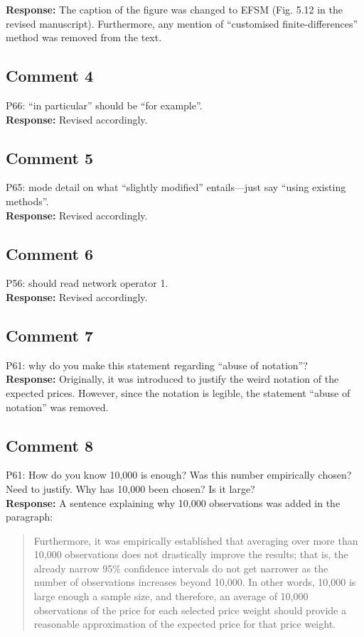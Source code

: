 \documentclass[10pt,a4paper,notitlepage]{article}
\numberwithin{equation}{section}
\begin{document}
\textbf{Response:}
The caption of the figure was changed to EFSM (Fig. 5.12 in the revised manuscript). Furthermore, any mention of ``customised finite-differences'' method was removed from the text.

\subsection{Comment 4}
P66: ``in particular'' should be ``for example''.\\[-2ex]

\textbf{Response:}
Revised accordingly.

\subsection{Comment 5}
P65: mode detail on what ``slightly modified'' entails---just say ``using existing methods''.\\[-2ex]

\textbf{Response:}
Revised accordingly.

\subsection{Comment 6}
P56: should read network operator 1.\\[-2ex]

\textbf{Response:}
Revised accordingly.

\subsection{Comment 7}
P61: why do you make this statement regarding ``abuse of notation''?\\[-2ex]

\textbf{Response:}
Originally, it was introduced to justify the weird notation of the expected prices. However, since the notation is legible, the statement ``abuse of notation'' was removed.

\subsection{Comment 8}
P61: How do you know 10,000 is enough? Was this number empirically chosen? Need to justify. Why has 10,000 been chosen? Is it large?\\[-2ex]

\textbf{Response:}
A sentence explaining why 10,000 observations was added in the paragraph:
\begin{quote}
Furthermore, it was empirically established that averaging over more than 10,000 observations does not drastically improve the results; that is, the already narrow 95\% confidence intervals do not get narrower as the number of observations increases beyond 10,000. In other words, 10,000 is large enough a sample size, and therefore, an average of 10,000 observations of the price for each selected price weight should provide a reasonable approximation of the expected price for that price weight.
\end{quote}
\end{document}
